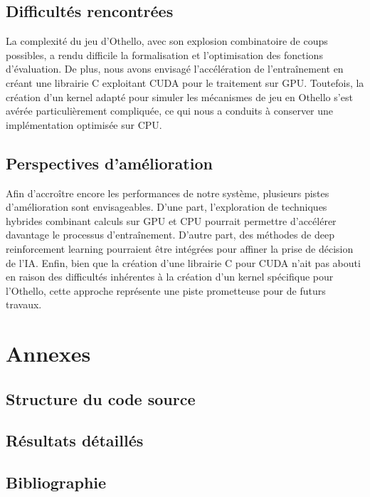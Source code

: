 \documentclass[a4paper,12pt]{article}
\begin{document}
\subsection{Difficultés rencontrées}
La complexité du jeu d'Othello, avec son explosion combinatoire de coups possibles, a rendu difficile la formalisation et l'optimisation des fonctions d'évaluation. De plus, nous avons envisagé l'accélération de l'entraînement en créant une librairie C exploitant CUDA pour le traitement sur GPU. Toutefois, la création d'un kernel adapté pour simuler les mécanismes de jeu en Othello s'est avérée particulièrement compliquée, ce qui nous a conduits à conserver une implémentation optimisée sur CPU.

\subsection{Perspectives d'amélioration}
Afin d'accroître encore les performances de notre système, plusieurs pistes d'amélioration sont envisageables. D'une part, l'exploration de techniques hybrides combinant calculs sur GPU et CPU pourrait permettre d'accélérer davantage le processus d'entraînement. D'autre part, des méthodes de deep reinforcement learning pourraient être intégrées pour affiner la prise de décision de l'IA. Enfin, bien que la création d'une librairie C pour CUDA n'ait pas abouti en raison des difficultés inhérentes à la création d'un kernel spécifique pour l'Othello, cette approche représente une piste prometteuse pour de futurs travaux.

\section{Annexes}
\subsection{Structure du code source}
\subsection{Résultats détaillés}
\subsection{Bibliographie}
\end{document}
